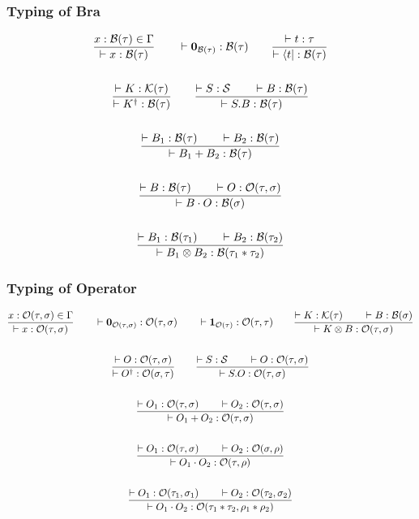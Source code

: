 \subsubsection*{Typing of Bra}
  \begin{gather*}
    \frac{x : \mathcal{B}(\tau) \in \Gamma}{\vdash x : \mathcal{B}(\tau)}
    \qquad
    \vdash \mathbf{0}_{\mathcal{B}(\tau)} : \mathcal{B}(\tau)
    \qquad
    \frac{\vdash t : \tau}{\vdash \langle t| : \mathcal{B}(\tau)} \\
    \\
    \frac{\vdash K : \mathcal{K}(\tau)}{\vdash K^\dagger : \mathcal{B}(\tau)}
    \qquad
    \frac{\vdash S : \mathcal{S} \qquad \vdash B : \mathcal{B}(\tau)}{\vdash S.B : \mathcal{B}(\tau)} \\
    \\
    \frac{\vdash B_1 : \mathcal{B}(\tau) \qquad \vdash B_2 : \mathcal{B}(\tau)}{\vdash B_1 + B_2 : \mathcal{B}(\tau)} \\
    \\
    \frac{\vdash B : \mathcal{B}(\tau) \qquad \vdash O : \mathcal{O}(\tau, \sigma)}{\vdash B \cdot O : \mathcal{B}(\sigma)} \\
    \\
    \frac{\vdash B_1 : \mathcal{B}(\tau_1) \qquad \vdash B_2 : \mathcal{B}(\tau_2)}{\vdash B_1 \otimes B_2 : \mathcal{B}(\tau_1 * \tau_2)}
  \end{gather*}


\subsubsection*{Typing of Operator}
  \begin{gather*}
  \frac{x : \mathcal{O}(\tau, \sigma) \in \Gamma}{\vdash x : \mathcal{O}(\tau, \sigma)}
  \qquad
  \vdash \mathbf{0}_{\mathcal{O}(\tau, \sigma)} : \mathcal{O}(\tau, \sigma) 
  \qquad
  \vdash \textbf{1}_{\mathcal{O}(\tau)} : \mathcal{O}(\tau, \tau) 
  \qquad
  \frac{\vdash K : \mathcal{K}(\tau) \qquad \vdash B : \mathcal{B}(\sigma)}{\vdash K \otimes B : \mathcal{O}(\tau, \sigma)} \\
  \\
  \frac{\vdash O : \mathcal{O}(\tau, \sigma)}{\vdash O^\dagger : \mathcal{O}(\sigma, \tau)}
  \qquad
  \frac{\vdash S : \mathcal{S} \qquad \vdash O : \mathcal{O}(\tau, \sigma)}{\vdash S.O : \mathcal{O}(\tau, \sigma)} \\
  \\
  \frac{\vdash O_1 : \mathcal{O}(\tau, \sigma) \qquad \vdash O_2 : \mathcal{O}(\tau, \sigma)}{\vdash O_1 + O_2 : \mathcal{O}(\tau, \sigma)} \\
  \\
  \frac{\vdash O_1 : \mathcal{O}(\tau, \sigma) \qquad \vdash O_2 : \mathcal{O}(\sigma, \rho)}{\vdash O_1 \cdot O_2 : \mathcal{O}(\tau, \rho)} \\
  \\
  \frac{\vdash O_1 : \mathcal{O}(\tau_1, \sigma_1) \qquad \vdash O_2 : \mathcal{O}(\tau_2, \sigma_2)}{\vdash O_1 \cdot O_2 : \mathcal{O}(\tau_1 * \tau_2, \rho_1 * \rho_2)}
\end{gather*}

